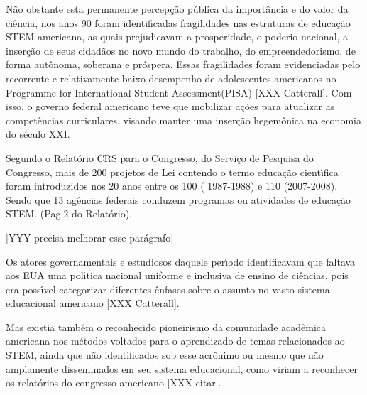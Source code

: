 \documentclass[
12pt,		%
openright,	%
twoside,  %
a4paper,			%
chapter=TITLE,		%
english,			%
french,				%
spanish,			%
brazil				%
]{USPSC-classe/USPSC_RedarTex}
\begin{document}
N\~ao obstante esta permanente percep\c{c}\~ao p\'ublica da import\^ancia e do valor da ci\^encia, nos anos 90 foram identificadas fragilidades nas estruturas de educa\c{c}\~ao STEM americana, as quais prejudicavam a prosperidade, o \textquotedbl poderio nacional\textquotedbl , a inser\c{c}\~ao de seus cidad\~aos no novo mundo do trabalho, do empreendedorismo, de forma aut\^onoma, soberana  e pr\'ospera. Essas fragilidades foram evidenciadas pelo recorrente e relativamente baixo desempenho de adolescentes americanos no \textquotedbl Programme for International Student Assessment\textquotedbl  (PISA) [XXX Catterall]. Com isso, o governo federal americano teve que mobilizar a\c{c}\~oes para atualizar as compet\^encias curriculares, visando manter uma inser\c{c}\~ao hegem\^onica na economia do s\'eculo XXI.








Segundo o Relat\'orio CRS para o Congresso, do Servi\c{c}o de Pesquisa do Congresso, mais de 200 projetos de Lei contendo o termo \textquotedbl  educa\c{c}\~ao cient\'{\i}fica \textquotedbl  foram introduzidos nos 20 anos entre os 100 ( 1987-1988) e 110 (2007-2008). Sendo que 13 ag\^encias federais conduzem programas ou atividades de educa\c{c}\~ao STEM. (Pag.2 do Relat\'orio). 








[YYY precisa melhorar esse par\'agrafo]








Os atores governamentais e estudiosos daquele per\'{\i}odo identificavam que faltava aos EUA uma pol\'{\i}tica nacional uniforme e inclusiva de ensino de ci\^encias, pois era poss\'{\i}vel categorizar diferentes \^enfases sobre o assunto no vasto sistema educacional americano [XXX Catterall].








Mas existia tamb\'em o reconhecido pioneirismo da comunidade acad\^emica americana nos m\'etodos voltados para o aprendizado de temas relacionados ao STEM, ainda que n\~ao identificados sob esse acr\^onimo ou mesmo que n\~ao amplamente disseminados em seu sistema educacional, como viriam a reconhecer os relat\'orios do congresso americano [XXX citar]. 
\end{document}
